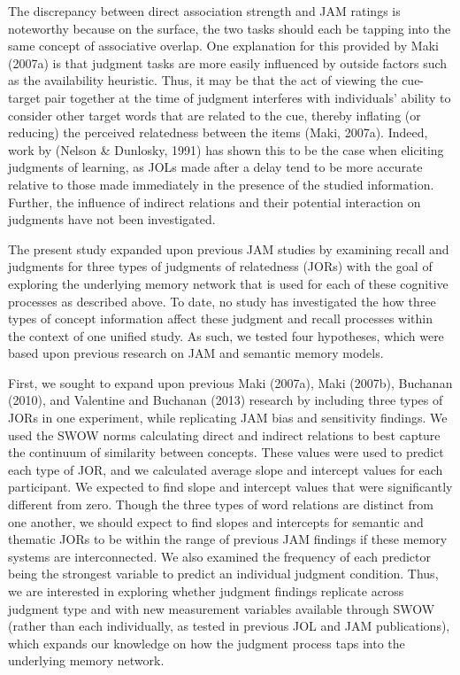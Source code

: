 \documentclass[english,,man]{apa6}
\begin{document}
The discrepancy between direct association strength and JAM ratings is noteworthy because on the surface, the two tasks should each be tapping into the same concept of associative overlap. One explanation for this provided by Maki (2007a) is that judgment tasks are more easily influenced by outside factors such as the availability heuristic. Thus, it may be that the act of viewing the cue-target pair together at the time of judgment interferes with individuals' ability to consider other target words that are related to the cue, thereby inflating (or reducing) the perceived relatedness between the items (Maki, 2007a). Indeed, work by (Nelson \& Dunlosky, 1991) has shown this to be the case when eliciting judgments of learning, as JOLs made after a delay tend to be more accurate relative to those made immediately in the presence of the studied information. Further, the influence of indirect relations and their potential interaction on judgments have not been investigated.

The present study expanded upon previous JAM studies by examining recall and judgments for three types of judgments of relatedness (JORs) with the goal of exploring the underlying memory network that is used for each of these cognitive processes as described above. To date, no study has investigated the how three types of concept information affect these judgment and recall processes within the context of one unified study. As such, we tested four hypotheses, which were based upon previous research on JAM and semantic memory models.

First, we sought to expand upon previous Maki (2007a), Maki (2007b), Buchanan (2010), and Valentine and Buchanan (2013) research by including three types of JORs in one experiment, while replicating JAM bias and sensitivity findings. We used the SWOW norms calculating direct and indirect relations to best capture the continuum of similarity between concepts. These values were used to predict each type of JOR, and we calculated average slope and intercept values for each participant. We expected to find slope and intercept values that were significantly different from zero. Though the three types of word relations are distinct from one another, we should expect to find slopes and intercepts for semantic and thematic JORs to be within the range of previous JAM findings if these memory systems are interconnected. We also examined the frequency of each predictor being the strongest variable to predict an individual judgment condition. Thus, we are interested in exploring whether judgment findings replicate across judgment type and with new measurement variables available through SWOW (rather than each individually, as tested in previous JOL and JAM publications), which expands our knowledge on how the judgment process taps into the underlying memory network.
\end{document}
